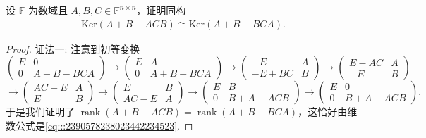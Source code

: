 \documentclass[../../main.tex]{subfiles}
\begin{document}
\begin{example}
设 $\mathbb{F}$ 为数域且 $A,B,C \in \mathbb{F}^{n \times n}$，证明同构
\begin{align}
\mathrm{Ker}(A + B - ACB) \cong \mathrm{Ker} (A + B - BCA). \label{eq:::2390578238023442234523}
\end{align}
\end{example}
\begin{proof}
{\color{blue}证法一:}
注意到初等变换
\[
\begin{pmatrix}
E & 0 \\
0 & A + B - BCA
\end{pmatrix} \to \begin{pmatrix}
E & A \\
0 & A + B - BCA
\end{pmatrix} \to \begin{pmatrix}
-E & A \\
-E + BC & B
\end{pmatrix} \to \begin{pmatrix}
E - AC & A \\
-E & B
\end{pmatrix}
\]
\[
\to \begin{pmatrix}
AC - E & A \\
E & B
\end{pmatrix} \to \begin{pmatrix}
E & B \\
AC - E & A
\end{pmatrix} \to \begin{pmatrix}
E & B \\
0 & B + A - ACB
\end{pmatrix} \to \begin{pmatrix}
E & 0 \\
0 & B + A - ACB
\end{pmatrix}.
\]
于是我们证明了 $\operatorname{rank}(A + B - ACB) = \operatorname{rank}(A + B - BCA)$，这恰好由维数公式是\eqref{eq:::2390578238023442234523}.


\end{proof}
\end{document}
